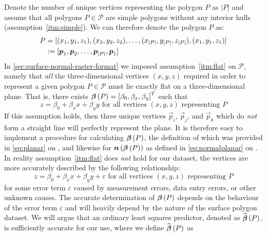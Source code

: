 Denote the number of unique vertices representing the polygon $P$ as $|P|$ and assume that all polygons $P \in \mathcal{P}$ are simple polygons without any interior hulls (assumption~\ref{itm:simple}).
We can therefore denote the polygon $P$ as:
\begin{align*}
  P
  &=
  [(x_1, y_1, z_1), (x_2, y_2, z_2), \dots, (x_{|P|}, y_{|P|}, z_{|P|}), (x_1, y_1, z_1)]
  \\
  &\vcentcolon=
  [\boldsymbol{p}_1, \boldsymbol{p}_2, \ldots, \boldsymbol{p}_{|P|}, \boldsymbol{p}_1]
\end{align*}
In \cref{sec:surface-normal-raster-format} we imposed assumption~\ref{itm:flat} on $\mathcal{P}$, namely that \emph{all} the three-dimensional vertices $(x, y, z)$ required in order to represent a given polygon $P \in \mathcal{P}$ must lie exactly flat on a three-dimensional plane.
That is, there exists $\boldsymbol{\beta}\left(P\right) = {[\beta_0, \beta_x, \beta_y]}^T$ such that
%
\begin{equation*}
  z = \beta_0 + \beta_x x + \beta_y y
  \text{ for all vertices } (x, y, z) \text{ representing } P
\end{equation*}
%
If this assumption holds, then three unique vertices $\vec{p}_i$, $\vec{p}_j$, and $\vec{p}_k$ which do \emph{not} form a straight line will perfectly represent the plane.
It is therefore easy to implement a procedure for calculating $\boldsymbol{\beta}\left(P\right)$, the definition of which was provided in \cref{eq:planar} on , and likewise for $\boldsymbol{n}\left(\boldsymbol{\beta}\left(P\right)\right)$ as defined in \cref{eq:normalplanar} on .
In reality assumption~\ref{itm:flat} does \emph{not} hold for our dataset, the vertices are more accurately described by the following relationship:
%
\begin{equation*}
  z = \beta_{0} + \beta_{x} x + \beta_{y} y + \varepsilon
  \text{ for all vertices } (x, y, z) \text{ representing } P
\end{equation*}
%
for some error term $\varepsilon$ caused by measurement errors, data entry errors, or other unknown causes.
The accurate determination of $\boldsymbol{\beta}\left(P\right)$ depends on the behaviour of the error term $\varepsilon$ and will heavily depend by the nature of the surface polygon dataset.
We will argue that an ordinary least squares predictor, denoted as $\widehat{\boldsymbol{\beta}}\left(P\right)$, is sufficiently accurate for our use, where we define $\widehat{\boldsymbol{\beta}}\left(P\right)$ as
